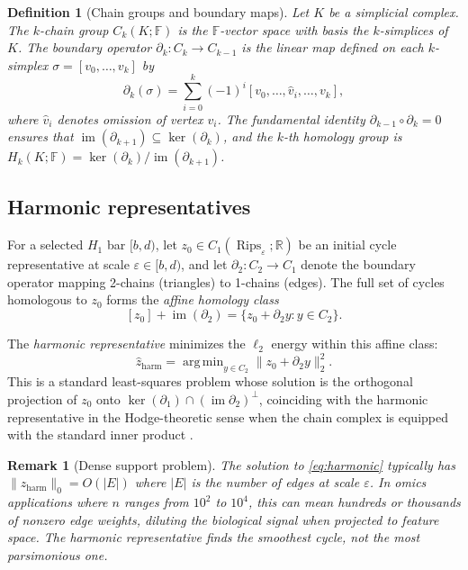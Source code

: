 \documentclass[11pt]{article}
\newtheorem{definition}[theorem]{Definition}
\newtheorem{remark}[theorem]{Remark}
\DeclareMathOperator{\Rips}{Rips}
\DeclareMathOperator*{\argmin}{arg\,min}
\begin{document}
\begin{definition}[Chain groups and boundary maps]\label{def:chains}
Let $K$ be a simplicial complex.
The \emph{$k$-chain group} $C_k(K; \mathbb{F})$ is the $\mathbb{F}$-vector space with basis the $k$-simplices of $K$.
The \emph{boundary operator} $\partial_k: C_k \to C_{k-1}$ is the linear map defined on each $k$-simplex $\sigma = [v_0, \ldots, v_k]$ by
\[
\partial_k(\sigma) = \sum_{i=0}^k (-1)^i [v_0, \ldots, \hat{v}_i, \ldots, v_k],
\]
where $\hat{v}_i$ denotes omission of vertex $v_i$.
The fundamental identity $\partial_{k-1} \circ \partial_k = 0$ ensures that $\operatorname{im}(\partial_{k+1}) \subseteq \ker(\partial_k)$, and the $k$-th homology group is $H_k(K; \mathbb{F}) = \ker(\partial_k) / \operatorname{im}(\partial_{k+1})$.
\end{definition}

\subsection{Harmonic representatives}

For a selected $H_1$ bar $[b, d)$, let $z_0 \in C_1(\Rips_\varepsilon; \mathbb{R})$ be an initial cycle representative at scale $\varepsilon \in [b, d)$, and let $\partial_2 : C_2 \to C_1$ denote the boundary operator mapping 2-chains (triangles) to 1-chains (edges).
The full set of cycles homologous to $z_0$ forms the \emph{affine homology class}
\begin{equation}\label{eq:affine}
[z_0] + \operatorname{im}(\partial_2) = \{z_0 + \partial_2 y : y \in C_2\}.
\end{equation}

The \emph{harmonic representative} minimizes the $\ell_2$ energy within this affine class:
\begin{equation}\label{eq:harmonic}
\hat{z}_{\mathrm{harm}} = \argmin_{y \in C_2} \| z_0 + \partial_2 y \|_2^2.
\end{equation}
This is a standard least-squares problem whose solution is the orthogonal projection of $z_0$ onto $\ker(\partial_1) \cap (\operatorname{im} \partial_2)^\perp$, coinciding with the harmonic representative in the Hodge-theoretic sense when the chain complex is equipped with the standard inner product \cite{harmonicPH, friedman1998}.

\begin{remark}[Dense support problem]\label{rem:dense}
The solution to \eqref{eq:harmonic} typically has $\|\hat{z}_{\mathrm{harm}}\|_0 = O(|E|)$ where $|E|$ is the number of edges at scale $\varepsilon$.
In omics applications where $n$ ranges from $10^2$ to $10^4$, this can mean hundreds or thousands of nonzero edge weights, diluting the biological signal when projected to feature space.
The harmonic representative finds the smoothest cycle, not the most parsimonious one.
\end{remark}
\end{document}
